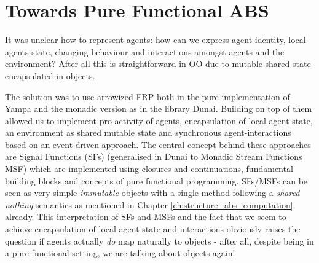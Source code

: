 \section{Towards Pure Functional ABS}
It was unclear how to represent agents: how can we express agent identity, local agents state, changing behaviour and interactions amongst agents and the environment? After all this is straightforward in OO due to mutable shared state encapsulated in objects.

The solution was to use arrowized FRP both in the pure implementation of Yampa and the monadic version as in the library Dunai. Building on top of them allowed us to implement pro-activity of agents, encapsulation of local agent state, an environment as shared mutable state and synchronous agent-interactions based on an event-driven approach. The central concept behind these approaches are Signal Functions (SFs) (generalised in Dunai to Monadic Stream Functions MSF) which are implemented using closures and continuations, fundamental building blocks and concepts of pure functional programming. SFs/MSFs can be seen as very simple \textit{immutable} objects with a single method following a \textit{shared nothing} semantics as mentioned in Chapter \ref{ch:structure_abs_computation} already. This interpretation of SFs and MSFs and the fact that we seem to achieve encapsulation of local agent state and interactions obviously raises the question if agents actually \textit{do} map naturally to objects - after all, despite being in a pure functional setting, we are talking about objects again!






